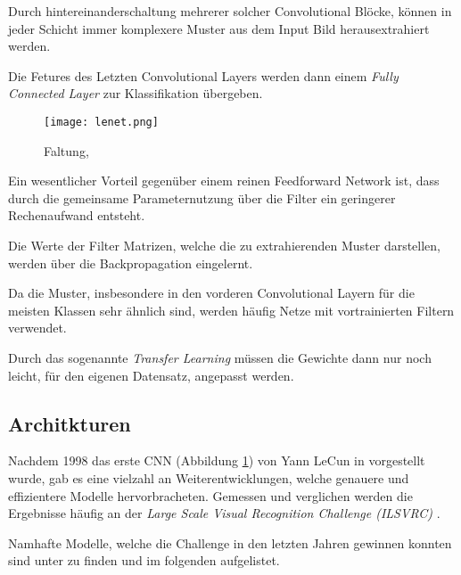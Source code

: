 Durch hintereinanderschaltung mehrerer solcher Convolutional Blöcke,
können in jeder Schicht immer komplexere Muster aus dem 
Input Bild herausextrahiert werden.

Die Fetures des Letzten Convolutional Layers werden dann einem 
\textit{Fully Connected Layer}  zur Klassifikation 
übergeben.


\vspace{1cm}
\begin{figure}[H]
    \centering
    \texttt{[image: lenet.png]}
    \caption{Faltung, \cite{lecunGradientBasedLearningApplied1998}}
    \label{fig:lenet}
\end{figure}
\vspace{1cm}


Ein wesentlicher Vorteil gegenüber einem reinen 
Feedforward Network ist, dass 
durch die gemeinsame Parameternutzung über die Filter ein 
geringerer Rechenaufwand entsteht.

Die Werte der Filter Matrizen, welche die zu 
extrahierenden Muster darstellen, 
werden über die Backpropagation eingelernt.

Da die Muster, insbesondere in den vorderen Convolutional 
Layern für die meisten Klassen sehr ähnlich sind,
werden häufig Netze mit vortrainierten Filtern 
verwendet.

Durch das sogenannte \textit{Transfer Learning}
müssen die Gewichte dann nur noch leicht, 
für den eigenen Datensatz, angepasst werden.



\subsection{Architkturen}\label{subsubsec:architectures}

Nachdem 1998 das erste CNN (Abbildung \ref{fig:lenet})
 von Yann LeCun in 
\cite{lecunGradientBasedLearningApplied1998} 
vorgestellt wurde, gab es eine vielzahl 
an Weiterentwicklungen, welche genauere und 
effizientere Modelle hervorbracheten.
Gemessen und verglichen werden die Ergebnisse häufig an 
der \textit{Large Scale Visual Recognition Challenge (ILSVRC)}
 \cite{ImageNetLargeScale}.
 

Namhafte Modelle, welche die Challenge in den letzten 
Jahren gewinnen konnten sind unter \cite{stanfordConvNetList}
zu finden und im folgenden aufgelistet.


